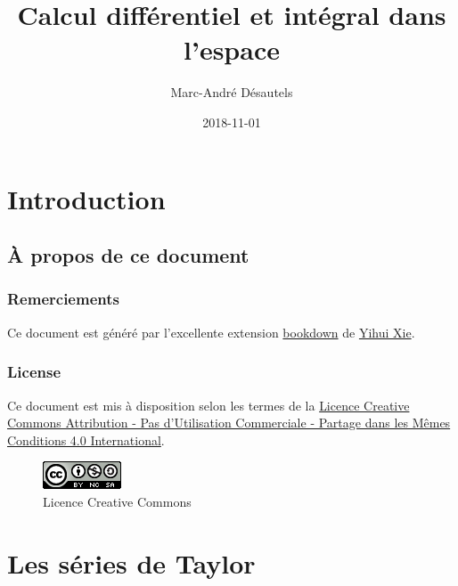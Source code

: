 \documentclass[]{book}
\title{Calcul différentiel et intégral dans l'espace}
\author{Marc-André Désautels}
\date{2018-11-01}
\theoremstyle{definition}
\theoremstyle{definition}
\theoremstyle{definition}
\theoremstyle{remark}
\begin{document}
\maketitle

{
\setcounter{tocdepth}{2}
\tableofcontents
}
\hypertarget{introduction}{%
\chapter*{Introduction}\label{introduction}}

\hypertarget{a-propos-de-ce-document}{%
\section*{À propos de ce document}\label{a-propos-de-ce-document}}

\hypertarget{remerciements}{%
\subsection*{Remerciements}\label{remerciements}}

Ce document est généré par l'excellente extension
\href{https://bookdown.org/}{bookdown} de
\href{https://yihui.name/}{Yihui Xie}.

\hypertarget{license}{%
\subsection*{License}\label{license}}

Ce document est mis à disposition selon les termes de la
\href{http://creativecommons.org/licenses/by-nc-sa/4.0/}{Licence
Creative Commons Attribution - Pas d'Utilisation Commerciale - Partage
dans les Mêmes Conditions 4.0 International}.

\begin{figure}
\centering
\includegraphics{resources/icons/license_cc.png}
\caption{Licence Creative Commons}
\end{figure}

\hypertarget{taylor}{%
\chapter{Les séries de Taylor}\label{taylor}}
\end{document}
